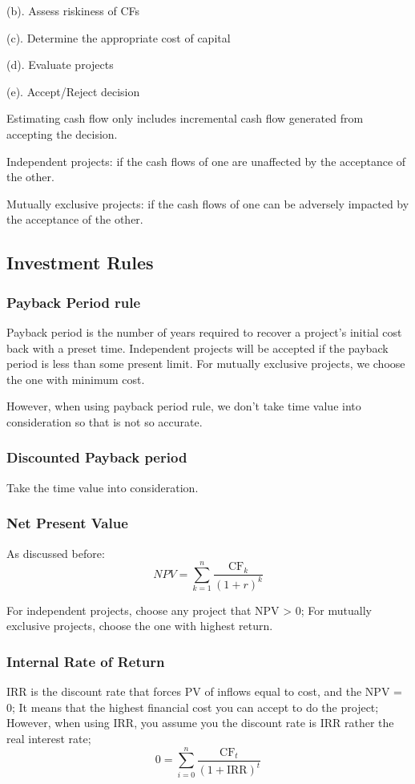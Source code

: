 \documentclass[10pt, a4paper]{article}
\begin{document}
            \quad(b). Assess riskiness of CFs

            \quad(c). Determine the appropriate cost of capital 

            \quad(d). Evaluate projects 
            
            \quad(e). Accept/Reject decision 

            Estimating cash flow only includes incremental cash flow generated from accepting the decision.
            
            Independent projects: if the cash flows of one are unaffected by the acceptance of the other. 

            Mutually exclusive projects: if the cash flows of one can be adversely impacted by the acceptance of the other. 
        \subsection{Investment Rules} 
            \subsubsection{Payback Period rule}
                Payback period is the number of years required to recover a project's initial cost back with a preset time. Independent projects will be accepted if the payback period is less than some present limit. For mutually exclusive projects, we choose the one with minimum cost.

                However, when using payback period rule, we don't take time value into consideration so that is not so accurate. 
            \subsubsection{Discounted Payback period}
                Take the time value into consideration. 
            \subsubsection{Net Present Value}
                As discussed before:
                $$NPV = \sum_{k = 1}^{n}\frac{\text{CF}_k}{(1 + r)^k}$$

                For independent projects, choose any project that NPV > 0; For mutually exclusive projects, choose the one with highest return. 
            \subsubsection{Internal Rate of Return}
                IRR is the discount rate that forces PV of inflows equal to cost, and the NPV = 0; It means that the highest financial cost you can accept to do the project; However, when using IRR, you assume you the discount rate is IRR rather the real interest rate; 
                $$0 = \sum_{i = 0}^{n}\frac{\text{CF}_t}{(1 + \text{IRR})^t}$$
\end{document}
